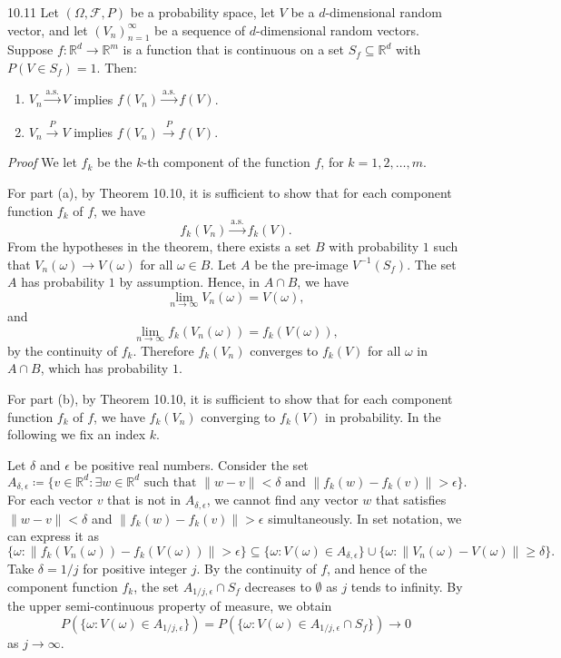 \begin{thmbox}{10.11}
Let $(\Omega,\mathcal{F},P)$ be a probability space, let $V$ be a $d$-dimensional random vector, and let $(V_n)_{n=1}^{\infty}$ be a sequence of $d$-dimensional random vectors. Suppose $f:\mathbb{R}^d\to\mathbb{R}^m$ is a function that is continuous on a set $S_f\subseteq\mathbb{R}^d$ with $P(V\in S_f)=1$. Then:
\begin{enumerate}
\item $V_n\xrightarrow{\mathrm{a.s.}}V$ implies $f(V_n)\xrightarrow{\mathrm{a.s.}}f(V)$.
\item $V_n\xrightarrow{P}V$ implies $f(V_n)\xrightarrow{P}f(V)$.
\end{enumerate}
\end{thmbox}

\textit{Proof}
We let $f_k$ be the $k$-th component of the function $f$, for $k=1,2,\ldots,m$.

For part (a), by Theorem 10.10, it is sufficient to show that for each component function $f_k$ of $f$, we have
\[
f_k(V_n)\xrightarrow{\mathrm{a.s.}}f_k(V).
\]
From the hypotheses in the theorem, there exists a set $B$ with probability $1$ such that $V_n(\omega)\to V(\omega)$ for all $\omega\in B$. Let $A$ be the pre-image $V^{-1}(S_f)$. The set $A$ has probability $1$ by assumption. Hence, in $A\cap B$, we have
\[
\lim_{n\to\infty}V_n(\omega)=V(\omega),
\]
and
\[
\lim_{n\to\infty}f_k(V_n(\omega))=f_k(V(\omega)),
\]
by the continuity of $f_k$. Therefore $f_k(V_n)$ converges to $f_k(V)$ for all $\omega$ in $A\cap B$, which has probability $1$.

For part (b), by Theorem 10.10, it is sufficient to show that for each component function $f_k$ of $f$, we have $f_k(V_n)$ converging to $f_k(V)$ in probability. In the following we fix an index $k$.

Let $\delta$ and $\epsilon$ be positive real numbers. Consider the set
\[
A_{\delta,\epsilon}\coloneqq
\{v\in\mathbb{R}^d:\exists w\in\mathbb{R}^d
\text{ such that }\lVert w-v\rVert<\delta
\text{ and }
\lVert f_k(w)-f_k(v)\rVert>\epsilon\}.
\]
For each vector $v$ that is not in $A_{\delta,\epsilon}$, we cannot find any vector $w$ that satisfies $\lVert w-v\rVert<\delta$ and $\lVert f_k(w)-f_k(v)\rVert>\epsilon$ simultaneously. In set notation, we can express it as
\[
\{\omega:\lVert f_k(V_n(\omega))-f_k(V(\omega))\rVert>\epsilon\}
\subseteq
\{\omega:V(\omega)\in A_{\delta,\epsilon}\}
\cup
\{\omega:\lVert V_n(\omega)-V(\omega)\rVert\geq\delta\}.
\]
Take $\delta=1/j$ for positive integer $j$. By the continuity of $f$, and hence of the component function $f_k$, the set $A_{1/j,\epsilon}\cap S_f$ decreases to $\emptyset$ as $j$ tends to infinity. By the upper semi-continuous property of measure, we obtain
\[
P(\{\omega:V(\omega)\in A_{1/j,\epsilon}\})
=
P(\{\omega:V(\omega)\in A_{1/j,\epsilon}\cap S_f\})
\to 0
\]
as $j\to\infty$.

